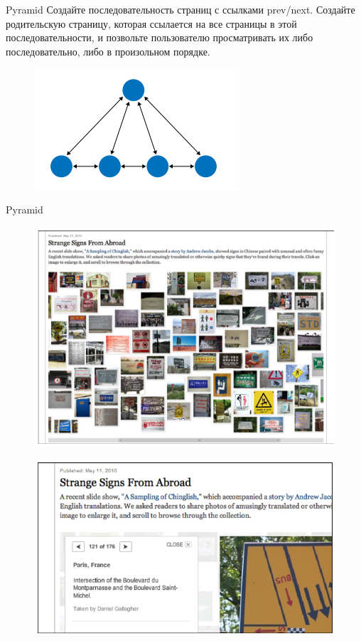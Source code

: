 \documentclass{beamer}
\begin{document}
\begin{frame}[t]{Pyramid}
	Создайте последовательность страниц с ссылками prev/next. Создайте родительскую страницу, которая ссылается на все страницы в этой последовательности, и позвольте пользователю просматривать их либо последовательно, либо в произольном порядке. 
	\begin{figure}[h]
		\centering
		\includegraphics[scale=0.5]{images/lec07-pic28.png}
	\end{figure}
\end{frame}

\begin{frame}[t]{Pyramid}
	\begin{figure}[h]
		\centering
		\includegraphics[scale=0.3]{images/lec07-pic29.png}
	\end{figure}
	\begin{figure}[h]
		\centering
		\includegraphics[scale=0.3]{images/lec07-pic30.png}
	\end{figure}
\end{frame}
\end{document}
